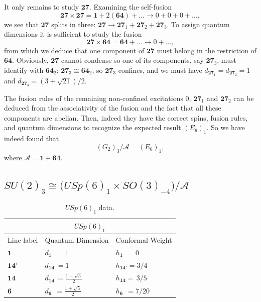 \documentclass[11pt]{article}
\numberwithin{equation}{section}
\begin{document}
It only remains to study $\mathbf{27}$. Examining the self-fusion
\begin{equation}
    \mathbf{27} \times \mathbf{27} = \mathbf{1} + 2 (\mathbf{64}) + \ldots \longrightarrow 0 + 0 + 0 + \ldots,
\end{equation}
we see that $\mathbf{27}$ splits in three: $\mathbf{27} \to \mathbf{27}_{1} + \mathbf{27}_{2} + \mathbf{27}_{3}$. To assign quantum dimensions it is sufficient to study the fusion
\begin{equation}
    \mathbf{27} \times \mathbf{64} = \mathbf{64} + \ldots \longrightarrow 0 + \ldots,
\end{equation}
from which we deduce that one component of $\mathbf{27}$ must belong in the restriction of $\mathbf{64}$. Obviously, $\mathbf{27}$ cannot condense so one of its components, say $\mathbf{27}_{3}$, must identify with $\mathbf{64}_{2}$: $\mathbf{27}_{3} \cong \mathbf{64}_{2}$, so $\mathbf{27}_{3}$ confines, and we must have $d_{\mathbf{27}_{1}} = d_{\mathbf{27}_{2}} = 1$ and $d_{\mathbf{27}_{3}} = (3 + \sqrt{21})/2$.

The fusion rules of the remaining non-confined excitations 0, $\mathbf{27}_{1}$ and $\mathbf{27}_{2}$ can be deduced from the associativity of the fusion and the fact that all these components are abelian. Then, indeed they have the correct spins, fusion rules, and quantum dimensions to recognize the expected result $(E_{6})_{1}$. So we have indeed found that
\begin{equation}
    (G_{2})_{3}/\mathcal{A} = (E_{6})_{1},
\end{equation}
where $\mathcal{A} = \mathbf{1} + \mathbf{64}$.






\subsection{$SU(2)_{3} \cong \big( USp(6)_{1} \times SO(3)_{-4} \big)/\mathcal{A}$} \label{SU23fromusP61SO3m4}

\begin{table}[t]
\centering
\begin{tabular}[h]{|p{4cm}|p{4cm}|p{4cm}| }
\hline 
\multicolumn{3}{|c|}{$USp(6)_{1}$} \\
\hline
Line label & Quantum Dimension & Conformal Weight  \\
\hline
$\mathbf{1}$ & $d_{\mathbf{1}} \ \ = 1$ & $h_{\mathbf{1}} \ \ = 0$ \\
$\mathbf{14}'$ & $d_{\mathbf{14}'} = 1$ & $h_{\mathbf{14}'}=3/4$ \\
$\mathbf{14}$ & $d_{\mathbf{14}} \, = \frac{1 + \sqrt{5}}{2}$ & $h_{\mathbf{14}} = \, 3/5$ \\
$\mathbf{6}$ & $d_{\mathbf{6}} \ \ = \frac{1 + \sqrt{5}}{2}$ & $h_{\mathbf{6}} \ \ = 7/20$ \\
\hline
\end{tabular}
\caption{$USp(6)_{1}$ data.}  \label{USp6lv1table}
\end{table}
\end{document}
